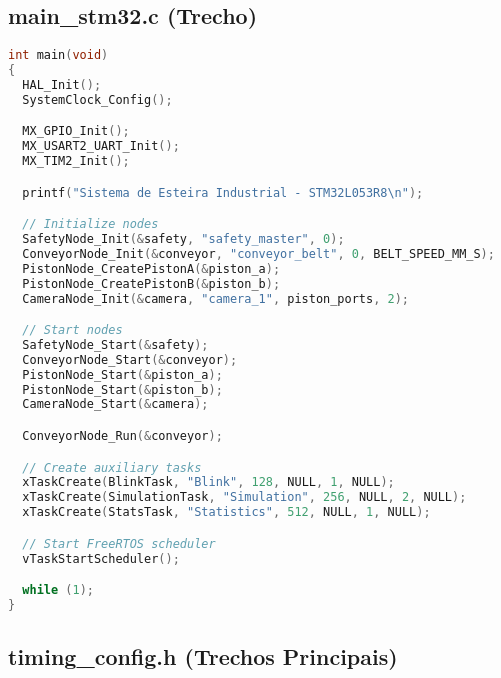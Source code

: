 \documentclass[12pt,a4paper]{article}
\begin{document}
\begin{center}
\end{center}

\vspace{1cm}

\subsection{main\_stm32.c (Trecho)}

\begin{lstlisting}[language=C, caption={Função main do sistema}]
int main(void)
{
  HAL_Init();
  SystemClock_Config();

  MX_GPIO_Init();
  MX_USART2_UART_Init();
  MX_TIM2_Init();

  printf("Sistema de Esteira Industrial - STM32L053R8\n");

  // Initialize nodes
  SafetyNode_Init(&safety, "safety_master", 0);
  ConveyorNode_Init(&conveyor, "conveyor_belt", 0, BELT_SPEED_MM_S);
  PistonNode_CreatePistonA(&piston_a);
  PistonNode_CreatePistonB(&piston_b);
  CameraNode_Init(&camera, "camera_1", piston_ports, 2);

  // Start nodes
  SafetyNode_Start(&safety);
  ConveyorNode_Start(&conveyor);
  PistonNode_Start(&piston_a);
  PistonNode_Start(&piston_b);
  CameraNode_Start(&camera);

  ConveyorNode_Run(&conveyor);

  // Create auxiliary tasks
  xTaskCreate(BlinkTask, "Blink", 128, NULL, 1, NULL);
  xTaskCreate(SimulationTask, "Simulation", 256, NULL, 2, NULL);
  xTaskCreate(StatsTask, "Statistics", 512, NULL, 1, NULL);

  // Start FreeRTOS scheduler
  vTaskStartScheduler();

  while (1);
}
\end{lstlisting}

\subsection{timing\_config.h (Trechos Principais)}
\end{document}
